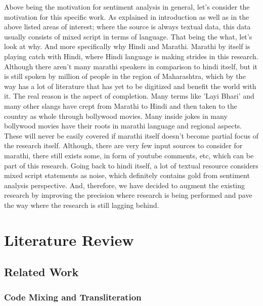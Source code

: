 \documentclass[12pt]{book}
\begin{document}
 Above being the motivation for sentiment analysis in general, let's consider the motivation for this specific work. As explained in introduction as well as in the above listed areas of interest; where the source is always textual data, this data usually consists of mixed script in terms of language. That being the what, let's look at why. And more specifically why Hindi and Marathi. Marathi by itself is playing catch with Hindi, where Hindi language is making strides in this research. Although there aren't many marathi speakers in comparison to hindi itself, but it is still spoken by million of people in the region of Maharashtra, which by the way has a lot of literature that has yet to be digitized and benefit the world with it. The real reason is the aspect of completion. Many terms like 'Layi Bhari' and many other slangs have crept from Marathi to Hindi and then taken to the country as whole through bollywood movies. Many inside jokes in many bollywood movies have their roots in marathi language and regional aspects. These will never be easily covered if marathi itself doesn't become partial focus of the research itself. Although, there are very few input sources to consider for marathi, there still exists some, in form of youtube comments, etc, which can be part of this research. Going back to hindi itself, a lot of textual resource considers mixed script statements as noise, which definitely contains gold from sentiment analysis perspective. And, therefore, we have decided to augment the existing research by improving the precision where research is being performed and pave the way where the research is still lagging behind.

\chapter{Literature Review}

\section{Related Work}

\subsection{Code Mixing and Transliteration}
\end{document}
